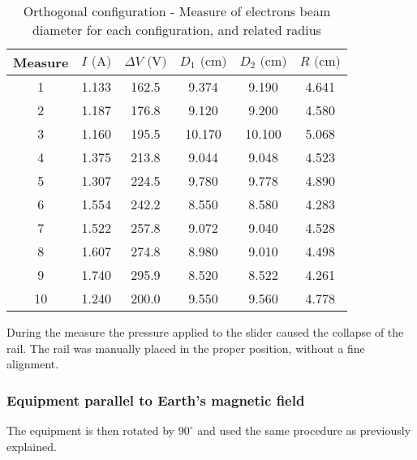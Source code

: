 \begin{table}[!htbp]
    {\par\centering
    \begin{tabular}{cccccc}
        \hline
        Measure & $I \text{ (A)}$ & $\Delta V \text{ (V)}$ & $D_1 \text{ (cm)}$ & $D_2 \text{ (cm)}$ & $R \text{ (cm)}$\\
        \hline
        1   &   1.133&   162.5&   9.374&   9.190& 4.641\\
        2   &   1.187&   176.8&   9.120&   9.200& 4.580\\
        3   &   1.160&   195.5&  10.170&  10.100& 5.068\\
        4   &   1.375&   213.8&   9.044&   9.048& 4.523\\
        5   &   1.307&   224.5&   9.780&   9.778& 4.890\\
        6   &   1.554&   242.2&   8.550&   8.580& 4.283\\
        7   &   1.522&   257.8&   9.072&   9.040& 4.528\\
        8   &   1.607&   274.8&   8.980&   9.010& 4.498\\
        9   &   1.740&   295.9&   8.520&   8.522& 4.261\\
        10  &   1.240&   200.0&   9.550&   9.560& 4.778\\
        \hline
    \end{tabular}
    \par}
    \caption{Orthogonal configuration - Measure of electrons beam diameter for each configuration, and related radius}
\end{table}

During the measure the pressure applied to the slider caused the collapse of the rail.
The rail was manually placed in the proper position, without a fine alignment. 

\subsubsection{Equipment parallel to Earth's magnetic field}
The equipment is then rotated by $90^{\circ}$ and used the same procedure as previously explained.


